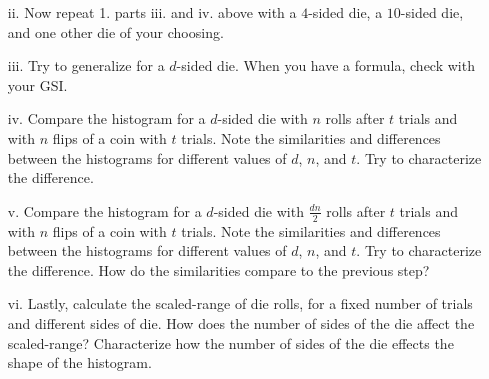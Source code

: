 \documentclass[11pt]{article}
\newif\ifsolutions
\begin{document}
\begin{enumerate}
\begin{enumerate}
\item[ii.] Now repeat 1. parts iii. and iv. above with a $4$-sided die, a $10$-sided die, and one other die of your choosing.

\ifsolutions
{\color{blue}{Solution: Rolling $8$ times with $100$ trails, $4$-sided die gives the most common value of $2$ and $10$-sided die gives the most common value of $0$(or $1$). With $n$ rolls, a $4$-sided die will give the most common value of $n/4$ for the number of ``1''s rolled and a $10$-sided die gives $n/10$.}}
\fi

\item[iii.] Try to generalize for a $d$-sided die. When you have a formula, check with your GSI.

\ifsolutions
{\color{blue}{Solution: A $d$-sided die with $n$ rolls will give the most common value of $n/d$ for the number of ``1''s rolled.}}
\fi


\item[iv.] Compare the histogram for a $d$-sided die with $n$ rolls after $t$ trials and with $n$ flips of a coin with $t$ trials. Note the similarities and differences between the histograms for different values of $d$, $n$, and $t$. Try to characterize the difference.

\ifsolutions
{\color{blue}{Suggested test values: $d=4,n=8,t=10,100$; Guide the students using the following facts: $mean=np$, $var=tnp(1-p)$ with coin of $p=1/2$ and die of $p=1/d$. So, the more sides of a die, the smaller most common value as well as less spread.}}
\fi


\item[v.] Compare the histogram for a $d$-sided die with $\frac{dn}{2}$ rolls after $t$ trials and with $n$ flips of a coin with $t$ trials. Note the similarities and differences between the histograms for different values of $d$, $n$, and $t$. Try to characterize the difference. How do the similarities compare to the previous step?

\ifsolutions
{\color{blue}{Similar suggested values as in iv.; similar guide as in iv. Here,
coin has $mean=n/2, var=tn/4$  and die has $mean=n/2, var=tn\frac{1}{2}(1-\frac{1}{d})$.
So, we will see similar most common value, but a smaller spread in die rolls.}}
\fi


\item[vi.] Lastly, calculate the scaled-range of die rolls, for a fixed number of trials and different sides of die. How does the number of sides of the die affect the scaled-range? Characterize how the number of sides of the die effects the shape of the histogram.


\end{enumerate}
\end{enumerate}
\end{document}
